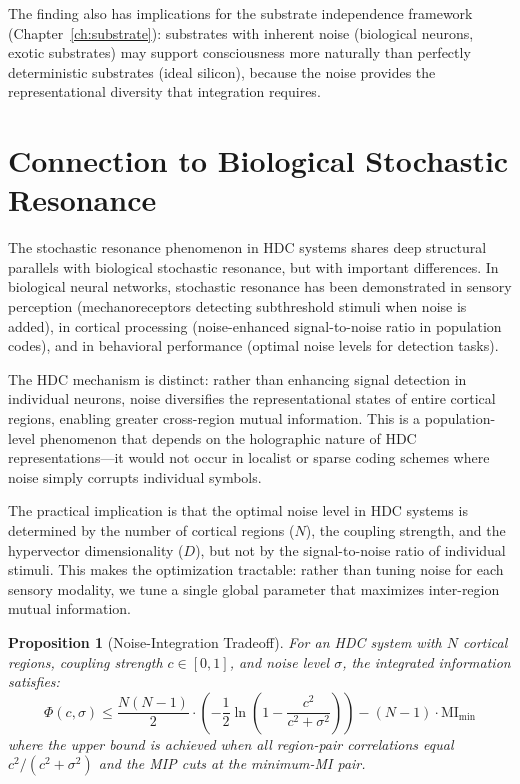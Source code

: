 \documentclass[12pt]{book}
\newtheorem{proposition}[theorem]{Proposition}
\begin{document}
The finding also has implications for the substrate independence framework (Chapter~\ref{ch:substrate}): substrates with inherent noise (biological neurons, exotic substrates) may support consciousness more naturally than perfectly deterministic substrates (ideal silicon), because the noise provides the representational diversity that integration requires.

\section{Connection to Biological Stochastic Resonance}

The stochastic resonance phenomenon in HDC systems shares deep structural parallels with biological stochastic resonance, but with important differences. In biological neural networks, stochastic resonance has been demonstrated in sensory perception (mechanoreceptors detecting subthreshold stimuli when noise is added), in cortical processing (noise-enhanced signal-to-noise ratio in population codes), and in behavioral performance (optimal noise levels for detection tasks).

The HDC mechanism is distinct: rather than enhancing signal detection in individual neurons, noise diversifies the representational states of entire cortical regions, enabling greater cross-region mutual information. This is a population-level phenomenon that depends on the holographic nature of HDC representations---it would not occur in localist or sparse coding schemes where noise simply corrupts individual symbols.

The practical implication is that the optimal noise level in HDC systems is determined by the number of cortical regions ($N$), the coupling strength, and the hypervector dimensionality ($D$), but not by the signal-to-noise ratio of individual stimuli. This makes the optimization tractable: rather than tuning noise for each sensory modality, we tune a single global parameter that maximizes inter-region mutual information.

\begin{proposition}[Noise-Integration Tradeoff]
For an HDC system with $N$ cortical regions, coupling strength $c \in [0, 1]$, and noise level $\sigma$, the integrated information satisfies:
\begin{equation}
\Phi(c, \sigma) \leq \frac{N(N-1)}{2} \cdot \left(-\frac{1}{2}\ln\left(1 - \frac{c^2}{c^2 + \sigma^2}\right)\right) - (N-1) \cdot \text{MI}_{\text{min}}
\end{equation}
where the upper bound is achieved when all region-pair correlations equal $c^2/(c^2 + \sigma^2)$ and the MIP cuts at the minimum-MI pair.
\end{proposition}
\end{document}
